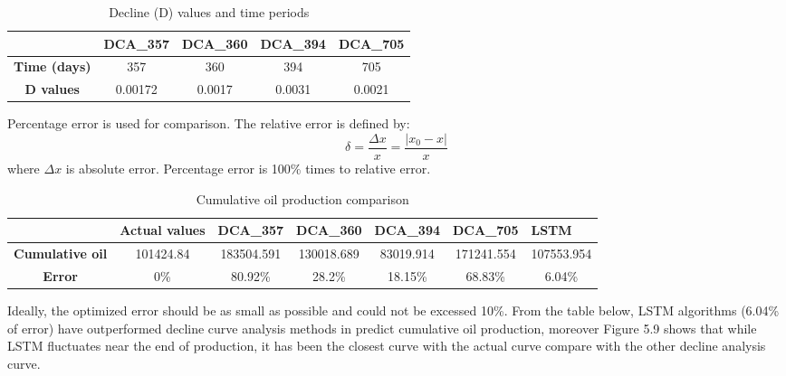 \documentclass[12pt,a4paper]{report}
\begin{document}
\begin{table}[H]
\caption{Decline (D) values and time periods}
\centering
\begin{tabular}{|c|c|c|c|c|}
\hline
                     & \textbf{DCA\_357} & \textbf{DCA\_360} & \textbf{DCA\_394} & \textbf{DCA\_705} \\ \hline
\textbf{Time (days)} & 357               & 360               & 394               & 705               \\ \hline
\textbf{D values}    & 0.00172           & 0.0017            & 0.0031            & 0.0021            \\ \hline
\end{tabular}
\end{table}
Percentage error is used for comparison. The relative error is defined by:
\begin{equation}
\delta = \frac{\Delta x}{x} = \frac{|x_{0} - x|}{x}
\end{equation}
where $\Delta x$ is absolute error. Percentage error is 100\% times to relative error.
\begin{table}[H]
\caption{Cumulative oil production comparison}
\centering
\begin{adjustbox}{width=1\textwidth}
\begin{tabular}{|c|c|c|c|c|c|c|}
\hline
                        & \multicolumn{1}{l|}{\textbf{Actual values}} & \textbf{DCA\_357} & \textbf{DCA\_360} & \textbf{DCA\_394} & \textbf{DCA\_705} & \multicolumn{1}{l|}{\textbf{LSTM}} \\ \hline
\textbf{Cumulative oil} & 101424.84                                   & 183504.591        & 130018.689        & 83019.914         & 171241.554        & 107553.954                         \\ \hline
\textbf{Error}          & 0\%                                         & 80.92\%          & 28.2\%            & 18.15\%           & 68.83\%           & 6.04\%                             \\ \hline
\end{tabular}
\end{adjustbox}
\end{table}
Ideally, the optimized error should be as small as possible and could not be excessed 10\%.
From the table below, LSTM algorithms (6.04\% of error) have outperformed decline curve analysis methods in predict cumulative oil production, moreover Figure 5.9 shows that while LSTM fluctuates near the end of production, it has been the closest curve with the actual curve compare with the other decline analysis curve.
\end{document}
